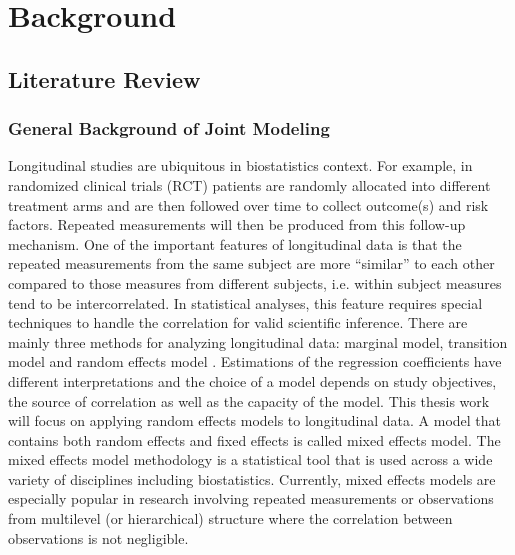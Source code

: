 





% 


\section{Background}
\subsection{Literature Review}
\subsubsection{General Background of Joint Modeling}\label{sec:bak_jm}
Longitudinal studies are ubiquitous in biostatistics context. For example, in randomized clinical trials (RCT) patients are randomly allocated into different treatment arms and are then followed over time to collect outcome(s) and risk factors. Repeated measurements will then be produced from this follow-up mechanism. One of the important features of longitudinal data is that the repeated measurements from the same subject are more ``similar'' to each other compared to those measures from different subjects, i.e. within subject measures tend to be intercorrelated. In statistical analyses, this feature requires special techniques to handle the correlation for valid scientific inference. There are mainly three methods for analyzing longitudinal data: marginal model, transition model and random effects model \citep{diggle2002analysis}. Estimations of the regression coefficients have different interpretations and the choice of a model depends on study objectives, the source of correlation as well as the capacity of the model. This thesis work will focus on applying random effects models to longitudinal data. A model that contains both random effects and fixed effects is called mixed effects model. The mixed effects model methodology is a statistical tool that is used across a wide variety of disciplines including biostatistics. Currently, mixed effects models are especially popular in research involving repeated measurements \citep{laird1982random} or observations from multilevel (or hierarchical) structure where the correlation between observations is not negligible.\par

